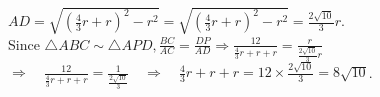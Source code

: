 \documentclass{article}
\begin{document}
\(A D=\sqrt{\left(\frac{4}{3} r+r\right)^{2}-r^{2}}=\sqrt{\left(\frac{4}{3} r+r\right)^{2}-r^{2}}=\frac{2 \sqrt{10}}{3} r\).\\
Since \(\triangle A B C \sim \triangle A P D, \frac{B C}{A C}=\frac{D P}{A D} \Rightarrow \frac{12}{\frac{4}{3} r+r+r}=\frac{r}{\frac{2 \sqrt{10}}{3} r}\)\\
\(\Rightarrow \quad \frac{12}{\frac{4}{3} r+r+r}=\frac{1}{\frac{2 \sqrt{10}}{3}} \quad \Rightarrow \quad \frac{4}{3} r+r+r=12 \times \frac{2 \sqrt{10}}{3}=8 \sqrt{10}\).
\end{document}
